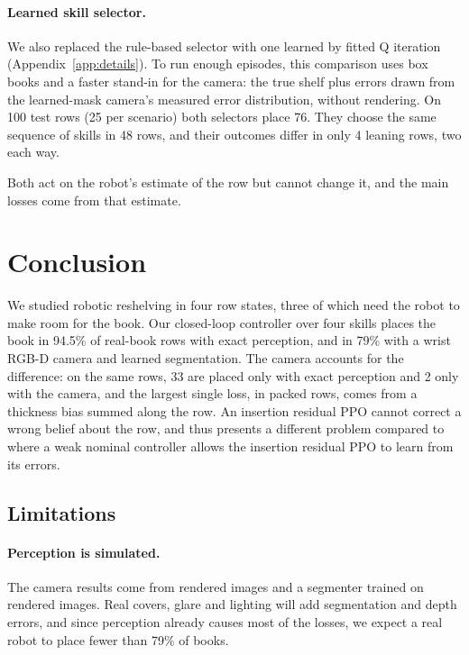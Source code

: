 \documentclass{article}
\begin{document}
\paragraph{Learned skill selector.} We also replaced the rule-based selector with one learned by fitted Q
iteration~\citep{ernst2005fqi, riedmiller2005nfq} (Appendix~\ref{app:details}). To run enough episodes,
this comparison uses box books and a faster stand-in for the camera: the true shelf plus errors drawn from
the learned-mask camera's measured error distribution, without rendering. On 100 test rows (25 per
scenario) both selectors place 76. They choose the same sequence of skills in 48 rows, and their outcomes
differ in only 4 leaning rows, two each way.

Both act on the robot's estimate of the row but cannot change it, and the main losses come from that
estimate.

\section{Conclusion}

We studied robotic reshelving in four row states, three of which need the robot to make room for the
book. Our closed-loop controller over four skills places the book in 94.5\% of real-book rows with exact
perception, and in 79\% with a wrist RGB-D camera and learned segmentation. The camera accounts for the difference: on the same rows, 33 are placed only with exact
perception and 2 only with the camera, and the largest single loss, in packed rows, comes from a thickness bias summed along the row. An insertion residual PPO cannot correct a wrong belief about the row, and thus presents a different problem compared to \citet{liu2026residual} where a weak nominal controller allows the insertion residual PPO to learn from its errors.

\subsection{Limitations}
\paragraph{Perception is simulated.} The camera results come from rendered images and a segmenter
trained on rendered images. Real covers, glare and lighting will add segmentation and depth errors, and
since perception already causes most of the losses, we expect a real robot to place fewer than 79\% of
books.
\end{document}
